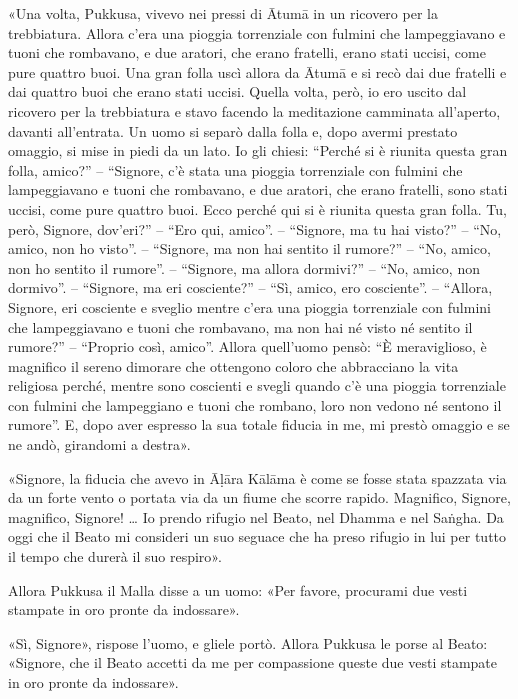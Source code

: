 «Una volta, Pukkusa, vivevo nei pressi di Ātumā in un ricovero per la
trebbiatura. Allora c’era una pioggia torrenziale con fulmini che lampeggiavano
e tuoni che rombavano, e due aratori, che erano fratelli, erano stati uccisi,
come pure quattro buoi. Una gran folla uscì allora da Ātumā e si recò dai due
fratelli e dai quattro buoi che erano stati uccisi. Quella volta, però, io ero
uscito dal ricovero per la trebbiatura e stavo facendo la meditazione camminata
all’aperto, davanti all’entrata. Un uomo si separò dalla folla e, dopo avermi
prestato omaggio, si mise in piedi da un lato. Io gli chiesi: “Perché si è
riunita questa gran folla, amico?” – “Signore, c’è stata una pioggia torrenziale
con fulmini che lampeggiavano e tuoni che rombavano, e due aratori, che erano
fratelli, sono stati uccisi, come pure quattro buoi. Ecco perché qui si è
riunita questa gran folla. Tu, però, Signore, dov’eri?” – “Ero qui, amico”. –
“Signore, ma tu hai visto?” – “No, amico, non ho visto”. – “Signore, ma non hai
sentito il rumore?” – “No, amico, non ho sentito il rumore”. – “Signore, ma
allora dormivi?” – “No, amico, non dormivo”. – “Signore, ma eri cosciente?” –
“Sì, amico, ero cosciente”. – “Allora, Signore, eri cosciente e sveglio mentre
c’era una pioggia torrenziale con fulmini che lampeggiavano e tuoni che
rombavano, ma non hai né visto né sentito il rumore?” – “Proprio così, amico”.
Allora quell’uomo pensò: “È meraviglioso, è magnifico il sereno dimorare che
ottengono coloro che abbracciano la vita religiosa perché, mentre sono coscienti
e svegli quando c’è una pioggia torrenziale con fulmini che lampeggiano e tuoni
che rombano, loro non vedono né sentono il rumore”. E, dopo aver espresso la sua
totale fiducia in me, mi prestò omaggio e se ne andò, girandomi a destra».

«Signore, la fiducia che avevo in Āḷāra Kālāma è come se fosse stata spazzata
via da un forte vento o portata via da un fiume che scorre rapido. Magnifico,
Signore, magnifico, Signore! … Io prendo rifugio nel Beato, nel Dhamma e nel
Saṅgha. Da oggi che il Beato mi consideri un suo seguace che ha preso rifugio in
lui per tutto il tempo che durerà il suo respiro».

Allora Pukkusa il Malla disse a un uomo: «Per favore, procurami due vesti
stampate in oro pronte da indossare».

«Sì, Signore», rispose l’uomo, e gliele portò. Allora Pukkusa le porse al Beato:
«Signore, che il Beato accetti da me per compassione queste due vesti stampate
in oro pronte da indossare».

